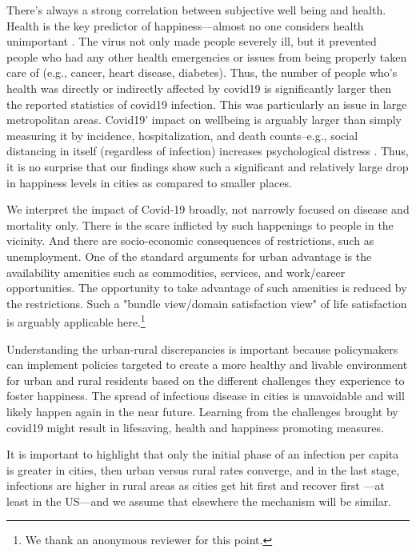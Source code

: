 \documentclass[10pt, letterpaper]{article}
\begin{document}
\begin{spacing}{1.4}
There's always a strong correlation between subjective well being and
health. Health is the key predictor of happiness---almost no one considers health
unimportant \citep[e.g.,][]{campbell76etal}. The virus not only made people
severely ill, but it prevented people who had any other health emergencies or
issues from being properly taken care of (e.g., cancer, heart disease,
diabetes). Thus, the number of people who's health was directly or indirectly affected by covid19 is significantly larger then the reported statistics of covid19 infection. This was
particularly an issue in large metropolitan areas. Covid19' impact on wellbeing is arguably larger than simply measuring it by incidence,
hospitalization, and death counts--e.g., social distancing in itself (regardless of infection) increases psychological distress \citep{khan2021quality}.
%
Thus, it is no surprise that our findings show such a significant and relatively
large drop in happiness levels in cities as compared to smaller places.

We interpret the impact of Covid-19 broadly, not narrowly  focused on disease
and mortality only. There is the scare inflicted by such happenings to people in the
vicinity. And there are socio-economic consequences of
  restrictions, such as unemployment. One of the standard arguments for urban
  advantage is the availability amenities such as commodities, services, and
  work/career opportunities. The opportunity to take advantage of such amenities
  is  reduced by the restrictions.  Such a
  "bundle view/domain satisfaction view" of life satisfaction is arguably
  applicable here.\footnote{We thank an anonymous reviewer for this point.}


Understanding the urban-rural discrepancies is important because policymakers can implement
policies targeted to create a more healthy and livable environment for urban and
rural residents based on the different challenges they experience to foster
happiness. The spread of infectious disease in cities is unavoidable and will
likely happen again in the near future. Learning from the challenges brought by
covid19 might result in lifesaving, health and happiness promoting measures.


It is important to highlight that only the initial phase of an infection per capita
is greater in cities, then urban versus rural rates converge, and in the last stage,
infections are higher in rural areas as cities get hit first and recover first
\citep{cuadros2021dynamics}---at least in the US---and we assume that elsewhere
the mechanism will be similar. 


\end{spacing}
\end{document}
